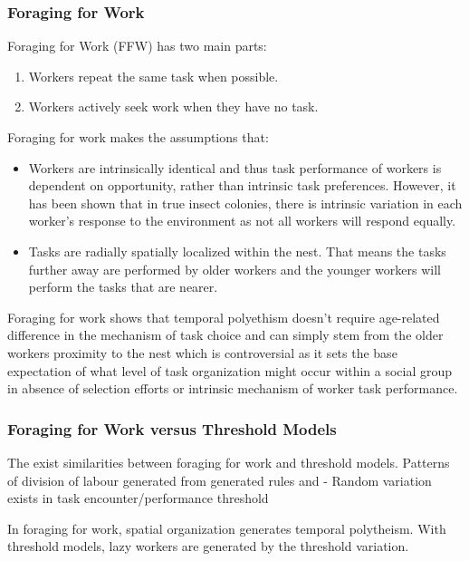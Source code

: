 \subsubsection{Foraging for Work}
Foraging for Work (FFW) has two main parts:
\begin{enumerate}
	\item Workers repeat the same task when possible.
	\item Workers actively seek work when they have no task.
\end{enumerate}


Foraging for work makes the assumptions that:
\begin{itemize}
	\item Workers are intrinsically identical and thus task performance of workers is dependent on opportunity, rather than intrinsic task preferences. However, it has been shown that in true insect colonies, there is intrinsic variation in each worker's response to the environment as not all workers will respond equally. 
	\item Tasks are radially spatially localized within the nest. That means the tasks further away are performed by older workers and the younger workers will perform the tasks that are nearer.
\end{itemize}

Foraging for work shows that temporal polyethism doesn't require age-related difference in the mechanism of task choice and can simply stem from the older workers proximity to the nest which is controversial as it sets the base expectation of what level of task organization might occur within a social group in absence of selection efforts or intrinsic mechanism of worker task performance.

\subsubsection{Foraging for Work versus Threshold Models} %
The exist similarities between foraging for work and threshold models. Patterns of division of labour generated from generated rules and 
- Random variation exists in task encounter/performance threshold

In foraging for work, spatial organization generates temporal polytheism. 
With threshold models, lazy workers are generated by the threshold variation. 


